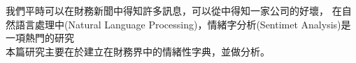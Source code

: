\begin{abstractCH}

\setlength{\baselineskip}{2.0em}
\setlength{\parindent}{2cm}
我們平時可以在財務新聞中得知許多訊息，可以從中得知一家公司的好壞，
在自然語言處理中(Natural Language Processing)，情緒字分析(Sentimet Analysis)是一項熱門的研究\\  
本篇研究主要在於建立在財務界中的情緒性字典，並做分析。


\end{abstractCH}
